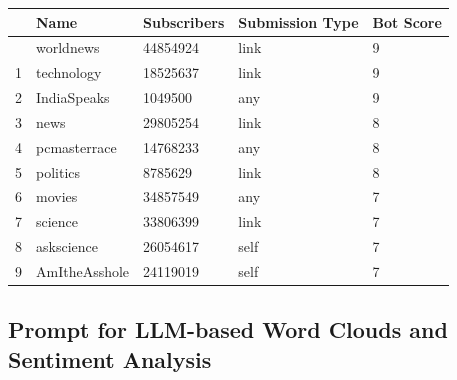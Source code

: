\documentclass[
  12pt,
  letterpaper,
  DIV=11,
  numbers=noendperiod,
  abstract]{scrartcl}
\begin{document}
\begin{longtable}[]{@{}lllll@{}}
\toprule\noalign{}
& Name & Subscribers & Submission Type & Bot Score \\
\midrule\noalign{}
\endhead
\bottomrule\noalign{}
\endlastfoot
0 & worldnews & 44854924 & link & 9 \\
1 & technology & 18525637 & link & 9 \\
2 & IndiaSpeaks & 1049500 & any & 9 \\
3 & news & 29805254 & link & 8 \\
4 & pcmasterrace & 14768233 & any & 8 \\
5 & politics & 8785629 & link & 8 \\
6 & movies & 34857549 & any & 7 \\
7 & science & 33806399 & link & 7 \\
8 & askscience & 26054617 & self & 7 \\
9 & AmItheAsshole & 24119019 & self & 7 \\
\end{longtable}

\subsection*{Prompt for LLM-based Word Clouds and Sentiment
Analysis}\label{prompt-for-llm-based-word-clouds-and-sentiment-analysis}
\end{document}
